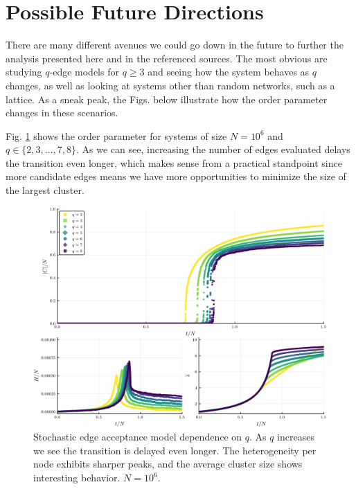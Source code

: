 \section{Possible Future Directions}
There are many different avenues we could go down in the future to further the analysis presented here and in the referenced sources.
The most obvious are studying $q$-edge models for $q \ge 3$ and seeing how the system behaves as $q$ changes, as well as looking at systems other than random networks, such as a lattice.
As a sneak peak, the Figs. below illustrate how the order parameter changes in these scenarios.

Fig. \ref{fig:q_scaling_triple} shows the order parameter for systems of size $N = 10^6$ and $q \in \{2, 3, ..., 7, 8\}$. As we can see, increasing the number of edges evaluated delays the transition even longer, which makes sense from a practical standpoint since more candidate edges means we have more opportunities to minimize the size of the largest cluster.

\begin{figure}
	\centering
	\includegraphics[width=350pt, clip]{images/q_scaling_triple.png}
	\caption{Stochastic edge acceptance model dependence on $q$. As $q$ increases we see the transition is delayed even longer. The heterogeneity per node exhibits sharper peaks, and the average cluster size shows interesting behavior. $N = 10^6$.}
	\label{fig:q_scaling_triple}
\end{figure}

